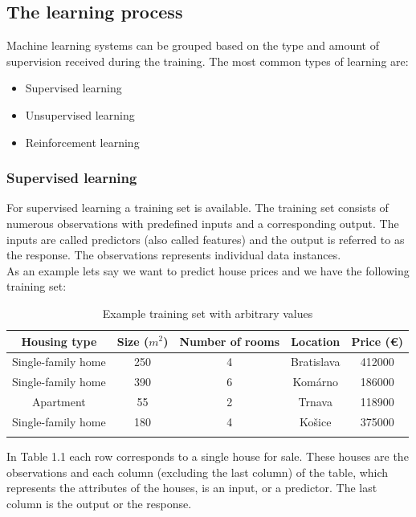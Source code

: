 \documentclass[a4paper,oneside,onecolumn,12pt]{LegrandOrangeBook}
\begin{document}
		\subsection{The learning process}
		Machine learning systems can be grouped based on the type and amount of supervision received during the training. The most common types of learning are:
		\begin{itemize}[noitemsep]
			\item Supervised learning
			\item Unsupervised learning
			\item Reinforcement learning
		\end{itemize}
		\cite{HMLSKT}
			
			\subsubsection{Supervised learning}
			For supervised learning a training set is available. The training set consists of numerous observations with predefined inputs and a corresponding output. The inputs are called predictors (also called features) and the output is referred to as the response. The observations represents individual data instances. \cite{TESL}\\
			As an example lets say we want to predict house prices and we have the following training set:\\
			\begin{table}[H]
			\begin{center}
			\begin{tabular}{|c|c|c|c||c|}
				\hline
				\textbf{Housing type} & \textbf{Size ($m^2$)} & \textbf{Number of rooms} & \textbf{Location} & \textbf{Price (€)}\\
				\hline
				Single-family home & 250 & 4 & Bratislava & 412000\\
				\hline
				Single-family home & 390 & 6 & Komárno & 186000\\ 
				\hline
				Apartment & 55 & 2 & Trnava & 118900\\
				\hline
				Single-family home & 180 & 4 & Košice & 375000\\
				\hline
				\multicolumn{5}{|c|}{\cdots} \\
				\hline
			\end{tabular}
			\end{center}
			\caption{Example training set with arbitrary values}
			\end{table}
			In Table 1.1 each row corresponds to a single house for sale. These houses are the observations and each column (excluding the last column) of the table, which represents the attributes of the houses, is an input, or a predictor. The last column is the output or the response.\\
\end{document}
